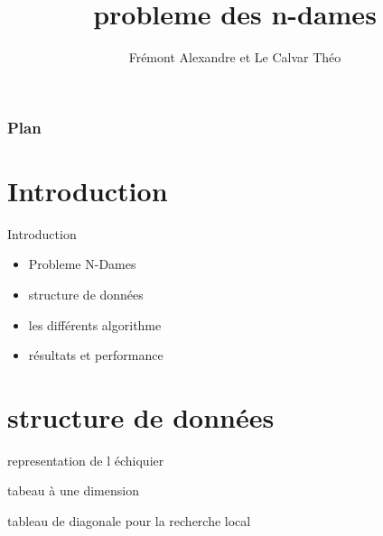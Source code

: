 \documentclass[10pt,a4paper]{beamer}
\author{Frémont Alexandre et Le Calvar Théo}
\title{probleme des n-dames}
\date{\displaydate{date}}
\begin{document}
\begin{frame}
\titlepage
\end{frame}

\begin{frame}
	\frametitle{Plan}
	\tableofcontents[pausesections]

\end{frame}

\section{Introduction}
\begin{frame}

	\begin{block}{Introduction}
	
	\begin{itemize}
		\item{Probleme N-Dames}

		\item{structure de données}

		\item{les différents algorithme}
		
		\item{résultats et performance}
	\end{itemize}

	\end{block}

\end{frame}

\section{structure de données}
\begin{frame}


	\begin{block}{representation de l échiquier}
		\item {tabeau à une dimension}
		\item {tableau de diagonale pour la recherche local}
	\end{block}


\end{frame}
\end{document}
